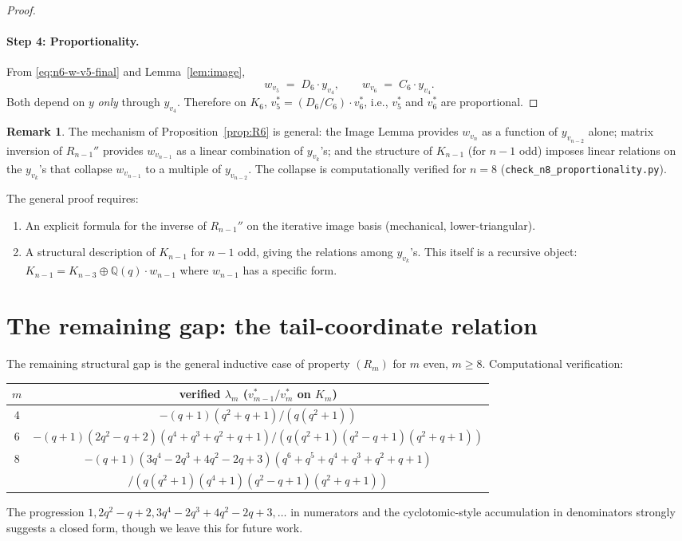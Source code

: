 \documentclass[11pt]{article}
\theoremstyle{definition}
\newtheorem{remark}[theorem]{Remark}
\begin{document}
\begin{proof}
\paragraph{Step 4: Proportionality.}
From \eqref{eq:n6-w-v5-final} and Lemma~\ref{lem:image},
\[
   w_{v_5} \;=\; D_6 \cdot y_{v_4}, \qquad w_{v_6} \;=\; C_6 \cdot y_{v_4}.
\]
Both depend on $y$ \emph{only} through $y_{v_4}$. Therefore on $K_6$,
$v_5^* = (D_6/C_6) \cdot v_6^*$, i.e., $v_5^*$ and $v_6^*$ are
proportional.
\end{proof}

\begin{remark}\label{rem:R6-general}
The mechanism of Proposition~\ref{prop:R6} is general: the Image
Lemma provides $w_{v_n}$ as a function of $y_{v_{n-2}}$ alone; matrix
inversion of $R_{n-1}''$ provides $w_{v_{n-1}}$ as a linear
combination of $y_{v_k}$'s; and the structure of $K_{n-1}$ (for $n-1$
odd) imposes linear relations on the $y_{v_k}$'s that collapse
$w_{v_{n-1}}$ to a multiple of $y_{v_{n-2}}$. The collapse is
computationally verified for $n=8$
(\texttt{check\_n8\_proportionality.py}).

The general proof requires:
\begin{enumerate}[topsep=0.3em,itemsep=0.2em,leftmargin=2em]
\item An explicit formula for the inverse of $R_{n-1}''$ on the
  iterative image basis (mechanical, lower-triangular).
\item A structural description of $K_{n-1}$ for $n-1$ odd, giving
  the relations among $y_{v_k}$'s. This itself is a recursive object:
  $K_{n-1} = K_{n-3} \oplus \mathbb{Q}(q) \cdot w_{n-1}$ where
  $w_{n-1}$ has a specific form.
\end{enumerate}
\end{remark}

\section{The remaining gap: the tail-coordinate relation}
\label{sec:gap}

The remaining structural gap is the general inductive case of
property $(R_m)$ for $m$ even, $m \ge 8$. Computational verification:
\begin{center}
\begin{tabular}{c c}
\toprule
$m$ & verified $\lambda_m$ ($v_{m-1}^*/v_m^*$ on $K_m$) \\
\midrule
$4$ & $-(q+1)(q^2+q+1)/(q(q^2+1))$ \\
$6$ & $-(q+1)(2q^2-q+2)(q^4+q^3+q^2+q+1)/(q(q^2+1)(q^2-q+1)(q^2+q+1))$ \\
$8$ & $-(q+1)(3q^4-2q^3+4q^2-2q+3)(q^6+q^5+q^4+q^3+q^2+q+1)$\\
    & $/(q(q^2+1)(q^4+1)(q^2-q+1)(q^2+q+1))$ \\
\bottomrule
\end{tabular}
\end{center}
The progression $1, 2q^2-q+2, 3q^4-2q^3+4q^2-2q+3, \ldots$ in
numerators and the cyclotomic-style accumulation in denominators
strongly suggests a closed form, though we leave this for future work.
\end{document}
